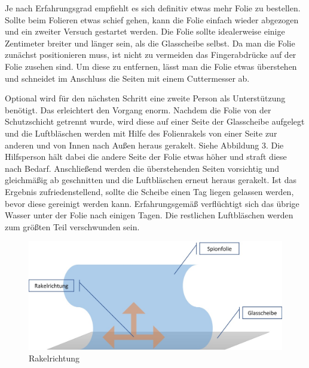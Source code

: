 Je nach Erfahrungsgrad empfiehlt es sich definitiv etwas mehr Folie zu bestellen. Sollte beim Folieren etwas schief gehen, kann die Folie einfach wieder abgezogen und ein zweiter Versuch gestartet werden. Die Folie sollte idealerweise einige Zentimeter breiter und länger sein, als die Glasscheibe selbst. Da man die Folie zunächst positionieren muss, ist nicht zu vermeiden das Fingerabdrücke auf der Folie zusehen sind. Um diese zu entfernen, lässt man die Folie etwas überstehen und schneidet im Anschluss die Seiten mit einem Cuttermesser ab.

Optional wird für den nächsten Schritt eine zweite Person als Unterstützung benötigt. Das erleichtert den Vorgang enorm. Nachdem die Folie von der Schutzschicht getrennt wurde, wird diese auf einer Seite der Glasscheibe aufgelegt und die Luftbläschen werden mit Hilfe des Folienrakels von einer Seite zur anderen und von Innen nach Außen heraus gerakelt. Siehe Abbildung 3. Die Hilfsperson hält dabei die andere Seite der Folie etwas höher und straft diese nach Bedarf. Anschließend werden die überstehenden Seiten vorsichtig und gleichmäßig ab geschnitten  und die Luftbläschen erneut heraus gerakelt. Ist das Ergebnis zufriedenstellend, sollte die Scheibe einen Tag liegen gelassen werden, bevor diese gereinigt werden kann. Erfahrungsgemäß verflüchtigt sich das übrige Wasser unter der Folie nach einigen Tagen. Die restlichen Luftbläschen werden zum größten Teil verschwunden sein.
\begin{figure}
	\begin{center}
		\includegraphics[scale=0.5]{bilder/Rakelanleitung.jpg}
	\end{center}
	\caption{Rakelrichtung}
	\vspace{-10pt}
\end{figure} 
